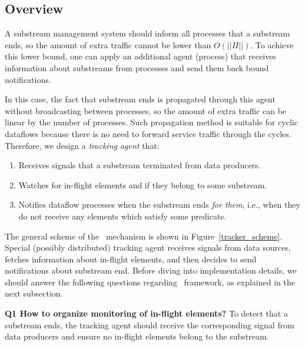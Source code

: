 \label{fs-acker-preliminaries}

\subsection{Overview}

A substream management system should inform all processes that a substream ends, so the amount of extra traffic cannot be lower than $O(||\Pi||)$. To achieve this lower bound, one can apply an additional agent (process) that receives information about substreams from processes and send them back bound notifications. 

In this case, the fact that substream ends is propagated through this agent without broadcasting between processes, so the amount of extra traffic can be linear by the number of processes. Such propagation method is suitable for cyclic dataflows because there is no need to forward service traffic through the cycles. Therefore, we design a {\em tracking agent} that:

\begin{enumerate}
    \item Receives signals that a substream terminated from data producers.
    \item Watches for in-flight elements and if they belong to some substream.
    \item Notifies dataflow processes when the substream ends {\em for them}, i.e., when they do not receive any elements which satisfy some predicate.
\end{enumerate}


The general scheme of the \tracker\ mechanism is shown in Figure~\ref{tracker_scheme}. Special (possibly distributed) tracking agent receives signals from data sources, fetches information about in-flight elements, and then decides to send notifications about substream end. Before diving into implementation details, we should answer the following questions regarding \tracker\ framework, as explained in the next subsection.

{\bf Q1 How to organize monitoring of in-flight elements?} To detect that a substream ends, the tracking agent should receive the corresponding signal from data producers and ensure no in-flight elements belong to the substream. 

